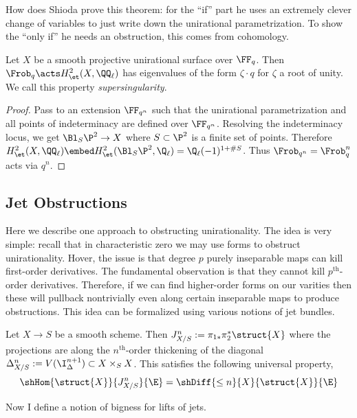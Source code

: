 \documentclass[12pt]{article}
\begin{document}
How does Shioda prove this theorem: for the ``if'' part he uses an extremely clever change of variables to just write down the unirational parametrization. To show the ``only if'' he needs an obstruction, this comes from \etale cohomology. 

\begin{prop}
Let $X$ be a smooth projective unirational surface over $\FF_q$. Then $\Frob_q \acts H^2_{\et}(X, \QQ_\ell)$ has eigenvalues of the form $\zeta \cdot q$ for $\zeta$ a root of unity. We call this property \textit{supersingularity}. 
\end{prop}

\begin{proof}
Pass to an extension $\FF_{q^n}$ such that the unirational parametrization and all points of indeterminacy are defined over $\FF_{q^n}$. Resolving the indeterminacy locus, we get $\Bl_S \P^2 \to X$ where $S \subset \P^2$ is a finite set of points. Therefore $H^2_{\et}(X, \QQ_\ell) \embed H^2_{\et}(\Bl_S \P^2, \Q_\ell) = \Q_\ell(-1)^{1 + \# S}$. Thus $\Frob_{q^n} = \Frob_{q}^n$ acts via $q^n$.  
\end{proof}


\subsection{Jet Obstructions}


Here we describe one approach to obstructing unirationality. The idea is very simple: recall that in characteristic zero we may use forms to obstruct unirationality. Hover, the issue is that degree $p$ purely inseparable maps can kill first-order derivatives. The fundamental observation is that they cannot kill $p^{\text{th}}$-order derivatives. Therefore, if we can find higher-order forms on our varities then these will pullback nontrivially even along certain inseparable maps to produce obstructions. This idea can be formalized using various notions of jet bundles.

\begin{defn}
Let $X \to S$ be a smooth scheme. Then $J^n_{X/S} := \pi_{1*} \pi_2^* \struct{X}$ where the projections are along the $n^{\text{th}}$-order thickening of the diagonal $\Delta^n_{X/S} := V(\I_{\Delta}^{n+1}) \subset X \times_S X$. This satisfies the following universal property,
\[ \shHom{\struct{X}}{J^n_{X/S}}{\E} = \shDiff{\le n}{X}{\struct{X}}{\E} \]
\end{defn}

Now I define a notion of bigness for lifts of jets.
\end{document}
